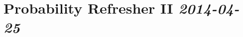 \section[2014-04-25: Probability Refresher II]{Probability Refresher II \small{\textit{2014-04-25}}}
